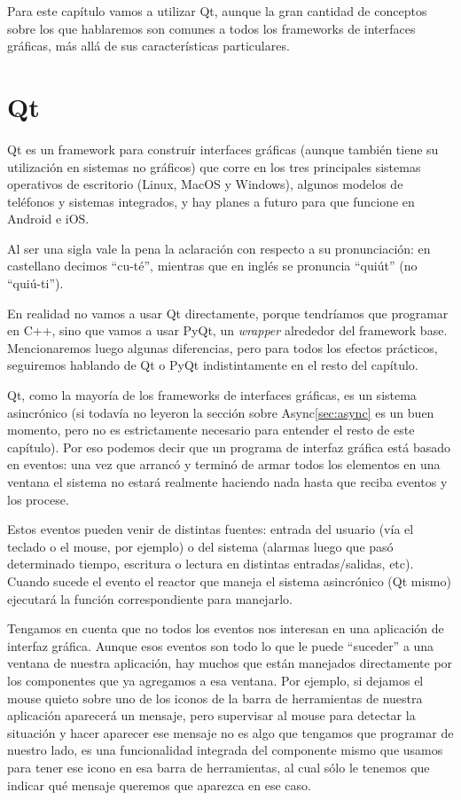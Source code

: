Para este capítulo vamos a utilizar Qt, aunque la gran cantidad de conceptos sobre los que hablaremos son comunes a todos los frameworks de interfaces gráficas, más allá de sus características particulares.


\section{Qt}

Qt es un framework para construir interfaces gráficas (aunque también tiene su utilización en sistemas no gráficos) que corre en los tres principales sistemas operativos de escritorio (Linux, MacOS y Windows), algunos modelos de teléfonos y sistemas integrados, y hay planes a futuro para que funcione en Android e iOS.

Al ser una sigla vale la pena la aclaración con respecto a su pronunciación: en castellano decimos ``cu-té'', mientras que en inglés se pronuncia ``quiút'' (no ``quiú-ti'').

En realidad no vamos a usar Qt directamente, porque tendríamos que programar en C++, sino que vamos a usar PyQt, un \textit{wrapper} alrededor del framework base. Mencionaremos luego algunas diferencias, pero para todos los efectos prácticos, seguiremos hablando de Qt o PyQt indistintamente en el resto del capítulo.

Qt, como la mayoría de los frameworks de interfaces gráficas, es un sistema asincrónico (si todavía no leyeron la sección sobre Async\ref{sec:async} es un buen momento, pero no es estrictamente necesario para entender el resto de este capítulo). Por eso podemos decir que un programa de interfaz gráfica está basado en eventos: una vez que arrancó y terminó de armar todos los elementos en una ventana el sistema no estará realmente haciendo nada hasta que reciba eventos y los procese.

Estos eventos pueden venir de distintas fuentes: entrada del usuario (vía el teclado o el mouse, por ejemplo) o del sistema (alarmas luego que pasó determinado tiempo, escritura o lectura en distintas entradas/salidas, etc). Cuando sucede el evento el reactor que maneja el sistema asincrónico (Qt mismo) ejecutará la función correspondiente para manejarlo.

Tengamos en cuenta que no todos los eventos nos interesan en una aplicación de interfaz gráfica. Aunque esos eventos son todo lo que le puede ``suceder'' a una ventana de nuestra aplicación, hay muchos que están manejados directamente por los componentes que ya agregamos a esa ventana. Por ejemplo, si dejamos el mouse quieto sobre uno de los iconos de la barra de herramientas de nuestra aplicación aparecerá un mensaje, pero supervisar al mouse para detectar la situación y hacer aparecer ese mensaje no es algo que tengamos que programar de nuestro lado, es una funcionalidad integrada del componente mismo que usamos para tener ese icono en esa barra de herramientas, al cual sólo le tenemos que indicar qué mensaje queremos que aparezca en ese caso.

